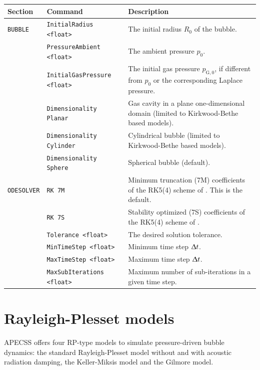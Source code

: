 \noindent
\begin{tabular}{p{} p{} p{}}
    \textbf{Section} &\textbf{Command} & \textbf{Description} 
\vspace{1mm} \\ \hline
{\tt BUBBLE} & {\tt InitialRadius <float>} & The initial radius $R_0$ of the bubble.\\ 
 & {\tt PressureAmbient <float>} & The ambient pressure $p_0$.\\ 
 & {\tt InitialGasPressure <float>} & The initial gas pressure $p_{\mathrm{G},0}$, if different from $p_0$ or the corresponding Laplace pressure.\\ 
 & {\tt Dimensionality Planar} & Gas cavity in a plane one-dimensional domain (limited to Kirkwood-Bethe based models).\\
 & {\tt Dimensionality Cylinder} & Cylindrical bubble (limited to Kirkwood-Bethe based models).\\
 & {\tt Dimensionality Sphere} & Spherical bubble (default).\\
{\tt ODESOLVER} & {\tt RK 7M} & Minimum truncation (7M) coefficients of the RK5(4) scheme of \citet{Dormand1980}. This is the default.\\ 
& {\tt RK 7S} & Stability optimized (7S) coefficients of the RK5(4) scheme of \citet{Dormand1980}.\\ 
& {\tt Tolerance <float>} & The desired solution tolerance.\\ 
& {\tt MinTimeStep <float>} & Minimum time step $\Updelta t$.\\ 
& {\tt MaxTimeStep <float>} & Maximum time step $\Updelta t$.\\ 
& {\tt MaxSubIterations <float>} & Maximum number of sub-iterations in a given time step.\\ 
 \hline
\end{tabular} \vspace{1em}

\section{Rayleigh-Plesset models}
\label{sec:rpmodels}

APECSS offers four RP-type models to simulate pressure-driven bubble dynamics: the standard Rayleigh-Plesset model without and with acoustic radiation damping, the Keller-Miksis model and the Gilmore model.

\vspace{0.8em}


